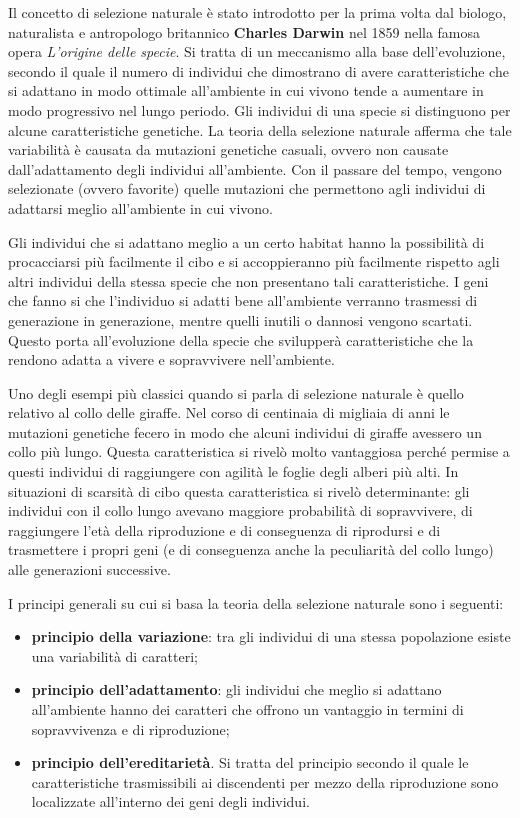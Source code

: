 \documentclass[11pt]{article}
\begin{document}
Il concetto di selezione naturale è stato introdotto per la prima volta dal biologo, naturalista e antropologo britannico \textbf{Charles Darwin} nel 1859 nella famosa opera \emph{L'origine delle specie}\cite{darwin1859}. Si tratta di un meccanismo alla base dell'evoluzione, secondo il quale il numero di individui che dimostrano di avere caratteristiche che si adattano in modo ottimale all'ambiente in cui vivono tende a aumentare in modo progressivo nel lungo periodo.
Gli individui di una specie si distinguono per alcune caratteristiche genetiche. La teoria della selezione naturale afferma che tale variabilità è causata da mutazioni genetiche casuali, ovvero non causate dall'adattamento degli individui all'ambiente. Con il passare del tempo, vengono selezionate (ovvero favorite) quelle mutazioni che permettono agli individui di adattarsi meglio all'ambiente in cui vivono. 

Gli individui che si adattano meglio a un certo habitat hanno la possibilità di procacciarsi più facilmente il cibo e si accoppieranno più facilmente rispetto agli altri individui della stessa specie che non presentano tali caratteristiche. I geni che fanno si che l'individuo si adatti bene all'ambiente verranno trasmessi di generazione in generazione, mentre quelli inutili o dannosi vengono scartati. Questo porta all'evoluzione della specie che svilupperà caratteristiche che la rendono adatta a vivere e sopravvivere nell'ambiente. 

Uno degli esempi più classici quando si parla di selezione naturale è quello relativo al collo delle giraffe. Nel corso di centinaia di migliaia di anni le mutazioni genetiche fecero in modo che alcuni individui di giraffe avessero un collo più lungo. Questa caratteristica si rivelò molto vantaggiosa perché permise a questi individui di raggiungere con agilità le foglie degli alberi più alti. In situazioni di scarsità di cibo questa caratteristica si rivelò determinante: gli individui con il collo lungo avevano maggiore probabilità di sopravvivere, di raggiungere l'età della riproduzione e di conseguenza di riprodursi e di trasmettere i propri geni (e di conseguenza anche la peculiarità del collo lungo) alle generazioni successive. 

I principi generali su cui si basa la teoria della selezione naturale sono i seguenti:
\begin{itemize}
    \item \textbf{principio della variazione}: tra gli individui di una stessa popolazione esiste una variabilità di caratteri;
    \item \textbf{principio dell'adattamento}: gli individui che meglio si adattano all'ambiente hanno dei caratteri che offrono un vantaggio in termini di sopravvivenza e di riproduzione;
    \item \textbf{principio dell'ereditarietà}. Si tratta del principio secondo il quale le caratteristiche trasmissibili ai discendenti per mezzo della riproduzione sono localizzate all'interno dei geni degli individui. 
\end{itemize}
\end{document}

